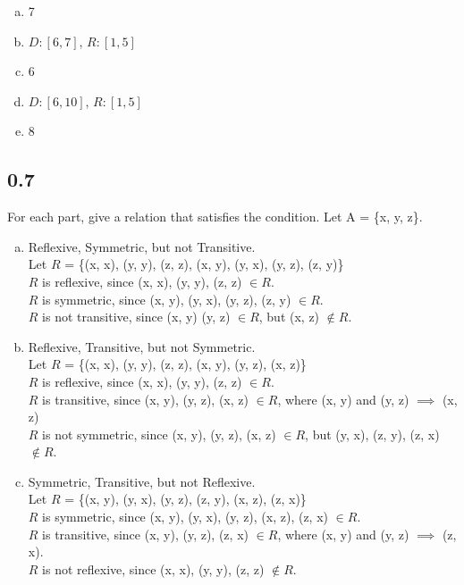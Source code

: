 \documentclass[11pt]{article}
\begin{document}
\begin{enumerate}[a.]
\item 7
\item $D: [6,7]$, $R: [1,5]$
\item 6
\item $D: [6,10]$, $R: [1,5]$
\item 8
\end{enumerate}

\subsection*{0.7}
For each part, give a relation that satisfies the condition. Let A = \{x, y, z\}.
\begin{enumerate}[a.]
\item Reflexive, Symmetric, but not Transitive. \\
Let $R$ = \{(x, x), (y, y), (z, z), (x, y), (y, x), (y, z), (z, y)\}\\
$R$ is reflexive, since (x, x), (y, y), (z, z) $\in R$.\\
$R$ is symmetric, since (x, y), (y, x), (y, z), (z, y) $\in R$.\\
$R$ is not transitive, since (x, y) (y, z) $\in R$, but (x, z) $\notin R$.
\item Reflexive, Transitive, but not Symmetric. \\
Let $R$ = \{(x, x), (y, y), (z, z), (x, y), (y, z), (x, z)\}\\
$R$ is reflexive, since (x, x), (y, y), (z, z) $\in R$.\\
$R$ is transitive, since (x, y), (y, z), (x, z) $\in R$, where (x, y) and (y, z) $\implies$ (x, z)\\
$R$ is not symmetric, since (x, y), (y, z), (x, z) $\in R$, but (y, x), (z, y), (z, x) $\notin R$.
\item Symmetric, Transitive, but not Reflexive.\\
Let $R$ = \{(x, y), (y, x), (y, z), (z, y), (x, z), (z, x)\}\\
$R$ is symmetric, since (x, y), (y, x), (y, z), (x, z), (z, x) $\in R$.\\
$R$ is transitive, since (x, y), (y, z), (z, x) $\in R$, where (x, y) and (y, z) $\implies$ (z, x).\\
$R$ is not reflexive, since (x, x), (y, y), (z, z) $\notin R$.
\end{enumerate}
\end{document}
